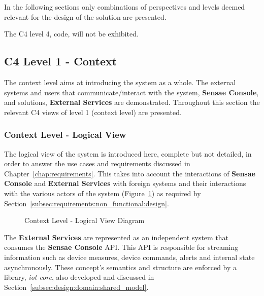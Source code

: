 In the following sections only combinations of perspectives and levels deemed relevant for the design of the solution are presented.

The C4 level 4, code, will not be exhibited.

\subsection{C4 Level 1 - Context}
\label{subsec:design:architecture:context}

The context level aims at introducing the system as a whole. The external systems and users that communicate/interact with the system, \textbf{Sensae Console}, and solutions, \textbf{External Services} are demonstrated.
Throughout this section the relevant C4 views of level 1 (context level) are presented.

\subsubsection{Context Level - Logical View}
\label{subsubsec:design:architecture:context:logical}

The logical view of the system is introduced here, complete but not detailed, in order to answer the use cases and requirements discussed in Chapter~\ref{chap:requirements}. This takes into account the interactions of \textbf{Sensae Console} and \textbf{External Services} with foreign systems and their interactions with the various actors of the system (Figure~\ref{fig:design:architecture:context:logical:diagram}) as required by Section~\ref{subsec:requirements:non_functional:design}.

\begin{figure}[H]
   \centering
   \resizebox{0.8\columnwidth}{!}
   {
      
   }
   \caption[Context Level - Logical View Diagram]{Context Level - Logical View Diagram}
   \label{fig:design:architecture:context:logical:diagram}
\end{figure}

The \textbf{External Services} are represented as an independent system that consumes the \textbf{Sensae Console} \gls{API}. This \gls{API} is responsible for streaming information such as device measures, device commands, alerts and internal state asynchronously. These concept's semantics and structure are enforced by a library, \textit{iot-core}, also developed and discussed in Section~\ref{subsec:design:domain:shared_model}.

